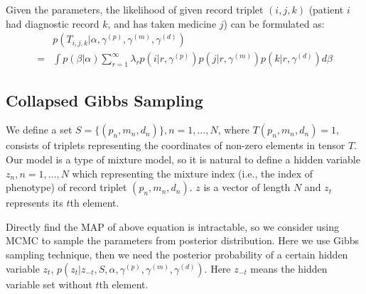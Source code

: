 \documentclass[conference]{IEEEtran}
\begin{document}
Given the parameters, the likelihood of given record triplet $(i, j, k)$ (patient $i$ had diagnostic record $k$, and has taken medicine $j$) can be formulated as:
	\begin{align*}
& p(T_{i, j, k} | \alpha, \gamma^{(p)}, \gamma^{(m)}, \gamma^{(d)}) \\
=& \int p(\beta | \alpha) \sum_{r=1}^{\infty} \lambda_r 
p(i | r, \gamma^{(p)})p(j | r, \gamma^{(m)})p(k | r, \gamma^{(d)}) d\beta
	\end{align*}

\subsection{Collapsed Gibbs Sampling}

We define a set $S = \{(p_n, m_n, d_n)\}, n = 1, \ldots, N$, where $T(p_n, m_n, d_n) = 1$, consists of triplets representing the coordinates of non-zero elements in tensor $T$. Our model is a type of mixture model, so it is natural to define a hidden variable $z_n, n = 1, \ldots, N$ which representing the mixture index (i.e., the index of phenotype) of record triplet $(p_n, m_n, d_n)$. $z$ is a vector of length $N$ and $z_t$ represents its $t$th element. 

Directly find the MAP of above equation is intractable, so we consider using MCMC to sample the parameters from posterior distribution. Here we use Gibbs sampling technique, then we need the posterior probability of a certain hidden variable $z_t$, $p(z_t | z_{-t}, S, \alpha, \gamma^{(p)}, \gamma^{(m)}, \gamma^{(d)})$. Here $z_{-t}$ means the hidden variable set without $t$th element.  
\end{document}
